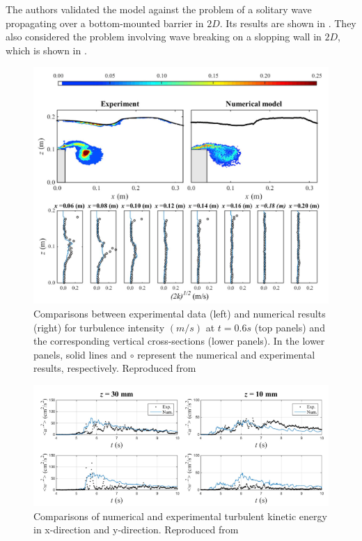 The authors validated the model against the problem of a solitary wave propagating over a bottom-mounted barrier in $2D$. Its results are shown in . They also considered the problem involving wave breaking on a slopping wall in $2D$, which is shown in .
\begin{figure}[H]
    \centering
    \includegraphics[scale=0.75]{Figures/research_papers/Wang2020-wave-propogation-result.png}
    \caption{Comparisons between experimental data (left) and numerical results (right) for turbulence intensity $(m/s)$ at $t=0.6s$ (top panels) and the corresponding vertical cross-sections (lower panels). In the lower panels, solid lines and $\circ$ represent the numerical and experimental results, respectively. Reproduced from \cite{Wang2020}}
    \label{fig:Wang2020-wave-propogation-result}
\end{figure}
\begin{figure}[H]
    \centering
    \includegraphics[scale=0.8]{Figures/research_papers/Wang2020-wave-breaking-result.png}
    \caption{Comparisons of numerical and experimental turbulent kinetic energy in x-direction and y-direction. Reproduced from \cite{Wang2020}}
    \label{fig:Wang2020-wave-breaking-result}
\end{figure}

